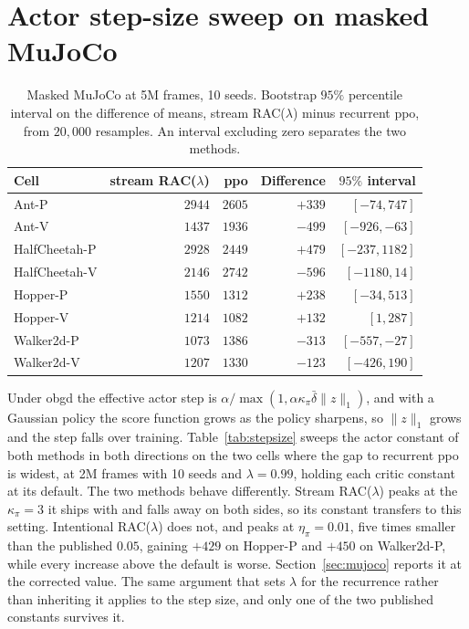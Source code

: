 \documentclass{article}
\begin{document}
\section{Actor step-size sweep on masked MuJoCo}
\label{sec:stepsize}

\begin{table}[htbp]
\centering
\caption{Masked MuJoCo at 5M frames, 10 seeds. Bootstrap $95\%$ percentile interval on the
difference of means, stream RAC($\lambda$) minus recurrent \gls{ppo}, from $20{,}000$ resamples.
An interval excluding zero separates the two methods.}
\label{tab:mujoco-intervals}
\begin{tabular}{lrrrr}
\toprule
Cell & stream RAC($\lambda$) & \gls{ppo} & Difference & $95\%$ interval \\
\midrule
Ant-P         & $2944$ & $2605$ & $+339$ & $[-74, 747]$ \\
Ant-V         & $1437$ & $1936$ & $-499$ & $[-926, -63]$ \\
HalfCheetah-P & $2928$ & $2449$ & $+479$ & $[-237, 1182]$ \\
HalfCheetah-V & $2146$ & $2742$ & $-596$ & $[-1180, 14]$ \\
Hopper-P      & $1550$ & $1312$ & $+238$ & $[-34, 513]$ \\
Hopper-V      & $1214$ & $1082$ & $+132$ & $[1, 287]$ \\
Walker2d-P    & $1073$ & $1386$ & $-313$ & $[-557, -27]$ \\
Walker2d-V    & $1207$ & $1330$ & $-123$ & $[-426, 190]$ \\
\bottomrule
\end{tabular}
\end{table}


Under \gls{obgd} the effective actor step is $\alpha / \max(1, \alpha \kappa_\pi
\bar{\delta} \|z\|_1)$, and with a Gaussian policy the score function grows as the policy
sharpens, so $\|z\|_1$ grows and the step falls over training. Table~\ref{tab:stepsize} sweeps
the actor constant of both methods in both directions on the two cells where the gap to recurrent
\gls{ppo} is widest, at 2M frames with 10 seeds and $\lambda = 0.99$, holding each critic
constant at its default. The two methods behave differently. Stream RAC($\lambda$) peaks at the
$\kappa_\pi = 3$ it ships with and falls away on both sides, so its constant transfers to this
setting. Intentional RAC($\lambda$) does not, and peaks at $\eta_\pi = 0.01$, five times smaller
than the published $0.05$, gaining $+429$ on Hopper-P and $+450$ on Walker2d-P, while every
increase above the default is worse. Section~\ref{sec:mujoco} reports it at the corrected value.
The same argument that sets $\lambda$ for the recurrence rather than inheriting it applies to the
step size, and only one of the two published constants survives it.
\end{document}
